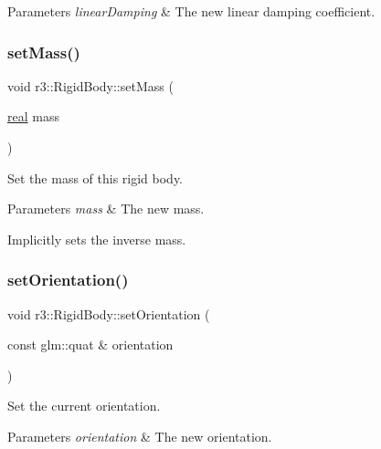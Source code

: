\begin{DoxyParams}{Parameters}
{\em linear\+Damping} & The new linear damping coefficient. \\
\hline
\end{DoxyParams}
\mbox{\label{classr3_1_1_rigid_body_a84c88437d863261773c9514d87bbc56a}} 
\subsubsection{\texorpdfstring{set\+Mass()}{setMass()}}
{\footnotesize\ttfamily void r3\+::\+Rigid\+Body\+::set\+Mass (\begin{DoxyParamCaption}\item[{\mbox{\hyperlink{namespacer3_ab2016b3e3f743fb735afce242f0dc1eb}{real}}}]{mass }\end{DoxyParamCaption})}



Set the mass of this rigid body. 


\begin{DoxyParams}{Parameters}
{\em mass} & The new mass.\\
\hline
\end{DoxyParams}
Implicitly sets the inverse mass. \mbox{\label{classr3_1_1_rigid_body_a2a93ca6f386411f14e5e8b844c214573}} 
\subsubsection{\texorpdfstring{set\+Orientation()}{setOrientation()}\hspace{0.1cm}{\footnotesize\ttfamily [1/2]}}
{\footnotesize\ttfamily void r3\+::\+Rigid\+Body\+::set\+Orientation (\begin{DoxyParamCaption}\item[{const glm\+::quat \&}]{orientation }\end{DoxyParamCaption})}



Set the current orientation. 


\begin{DoxyParams}{Parameters}
{\em orientation} & The new orientation. \\
\hline
\end{DoxyParams}
\mbox{\label{classr3_1_1_rigid_body_a8f6dcfce04ca4add81dce4f140e954c7}} 
